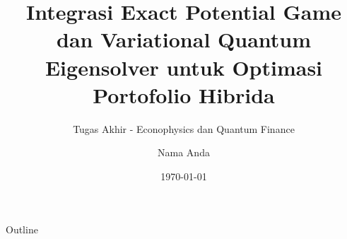\documentclass[aspectratio=169]{beamer}
\title[Integrasi EPG  dan   VQE]{Integrasi Exact Potential Game dan  Variational Quantum Eigensolver untuk Optimasi Portofolio Hibrida}
\subtitle{Tugas Akhir - Econophysics  dan   Quantum Finance}
\author[Nama Anda]{Nama Anda} %
\institute[Institusi]{Pembimbing: Nama Pembimbing \\ \medskip Departemen Fisika \\ Universitas ...}
\date{\today}
\begin{document}
\begin{frame}
    \titlepage
\end{frame}

\begin{frame}{Outline}
    \tableofcontents
\end{frame}


\end{document}
